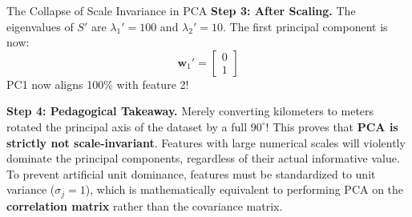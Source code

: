 \begin{examplebox}{The Collapse of Scale Invariance in PCA}
\textbf{Step 3: After Scaling.}
The eigenvalues of $S'$ are $\lambda_1' = 100$ and $\lambda_2' = 10$.
The first principal component is now:
\begin{equation}
\mathbf{w}_1' = \begin{bmatrix} 0 \\ 1 \end{bmatrix}
\end{equation}
PC1 now aligns 100\% with feature 2!

\textbf{Step 4: Pedagogical Takeaway.}
Merely converting kilometers to meters rotated the principal axis of the dataset by a full $90^\circ$!
This proves that \textbf{PCA is strictly not scale-invariant}. Features with large numerical scales will violently dominate the principal components, regardless of their actual informative value. To prevent artificial unit dominance, features must be standardized to unit variance ($\sigma_j = 1$), which is mathematically equivalent to performing PCA on the \textbf{correlation matrix} rather than the covariance matrix.
\end{examplebox}

